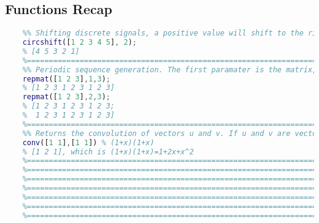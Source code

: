 \subsection{Functions Recap}
\begin{lstlisting}[language=Matlab, escapeinside=`']
    %==========================================================================
    %% Shifting discrete signals, a positive value will shift to the right. Circular, if shifting right by n, first n values will become the last n values
    circshift([1 2 3 4 5], 2);
    % [4 5 3 2 1]
    %==========================================================================
    %% Periodic sequence generation. The first paramater is the matrix, the second one is the rows repetition, the third is the cols repetition
    repmat([1 2 3],1,3);
    % [1 2 3 1 2 3 1 2 3]
    repmat([1 2 3],2,3);
    % [1 2 3 1 2 3 1 2 3;
    %  1 2 3 1 2 3 1 2 3] 
    %==========================================================================
    %% Returns the convolution of vectors u and v. If u and v are vectors of polynomial coefficients, convolving them is equivalent to multiplying the two polynomials.
    conv([1 1],[1 1]) % (1+x)(1+x)
    % [1 2 1], which is (1+x)(1+x)=1+2x+x^2
    %==========================================================================
    %==========================================================================
    %==========================================================================
    %==========================================================================
    %==========================================================================
    %==========================================================================
    %==========================================================================
\end{lstlisting}
